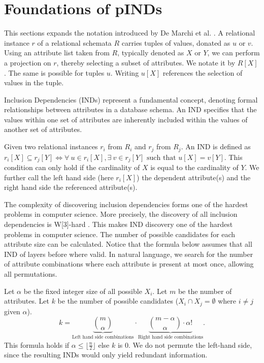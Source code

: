 \section{Foundations of pINDs}
This sections expands the notation introduced by De Marchi et al. \cite{marchi2009unary}. A relational instance $r$ of a relational schemata $R$ carries tuples of values, donated as $u$ or $v$. Using an attribute list taken from $R$, typically denoted as $X$ or $Y$, we can perform a projection on $r$, thereby selecting a subset of attributes. We notate it by $R[X]$. The same is possible for tuples $u$. Writing $u[X]$ references the selection of values in the tuple.

Inclusion Dependencies (INDs) represent a fundamental concept, denoting formal relationships between attributes in a database schema. An IND specifies that the values within one set of attributes are inherently included within the values of another set of attributes.

\begin{definition}\label{def:inds}
    Given two relational instances $r_i$ from $R_i$ and $r_j$ from $R_j$. An IND is defined as $r_i[X] \subseteq r_j[Y] \iff \forall \: u \in r_i[X], \exists \: v \in r_j[Y] \text{ such that } u[X] = v[Y]$. This condition can only hold if the cardinality of $X$ is equal to the cardinality of $Y$. We further call the left hand side (here $r_i[X]$) the dependent attribute(s) and the right hand side the referenced attribute(s).
\end{definition}

The complexity of discovering inclusion dependencies forms one of the hardest problems in computer science. More precisely, the discovery of all inclusion dependencies is W[3]-hard \cite{blasius2017parameterized}. This makes IND discovery one of the hardest problems in computer science. The number of possible candidates for each attribute size can be calculated. Notice that the formula below assumes that all IND of layers before where valid. In natural language, we search for the number of attribute combinations where each attribute is present at most once, allowing all permutations.

\begin{definition}\label{def:candidates}
    Let $\alpha$ be the fixed integer size of all possible $X_i$. Let $m$ be the number of attributes. Let $k$ be the number of possible candidates ($X_i \cap X_j = \emptyset$ where $i \not = j$ given $\alpha$).
    \[
        k = \underbrace{\binom{m}{\alpha}}_{\text{Left hand side combinations}} \cdot \underbrace{\binom{m-\alpha}{\alpha}\cdot \alpha!}_\text{Right hand side combinations}.
    \]
    This formula holds if $\alpha \leq \lfloor \frac{n}{2} \rfloor$ else $k$ is $0$. We do not permute the left-hand side, since the resulting INDs would only yield redundant information.
\end{definition}

